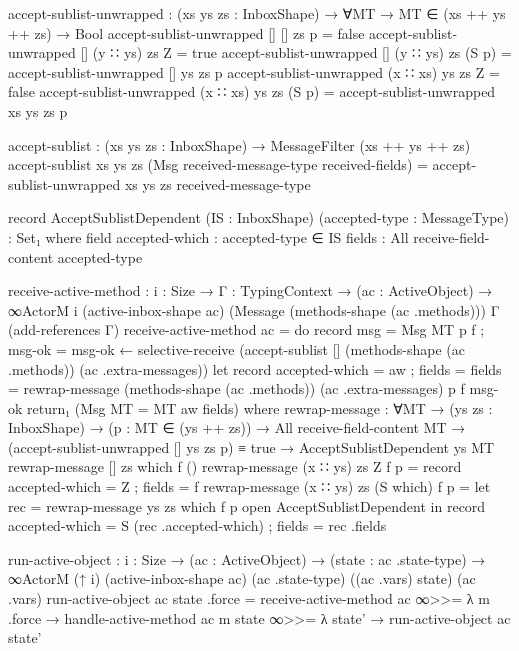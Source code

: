 \begin{code}
accept-sublist-unwrapped : (xs ys zs : InboxShape) → ∀{MT} → MT ∈ (xs ++ ys ++ zs) → Bool
accept-sublist-unwrapped [] [] zs p = false
accept-sublist-unwrapped [] (y ∷ ys) zs Z = true
accept-sublist-unwrapped [] (y ∷ ys) zs (S p) = accept-sublist-unwrapped [] ys zs p
accept-sublist-unwrapped (x ∷ xs) ys zs Z = false
accept-sublist-unwrapped (x ∷ xs) ys zs (S p) = accept-sublist-unwrapped xs ys zs p


accept-sublist : (xs ys zs : InboxShape) → MessageFilter (xs ++ ys ++ zs)
accept-sublist xs ys zs (Msg received-message-type received-fields) = accept-sublist-unwrapped xs ys zs received-message-type

record AcceptSublistDependent (IS : InboxShape) (accepted-type : MessageType) : Set₁ where
  field
    accepted-which : accepted-type ∈ IS
    fields : All receive-field-content accepted-type

receive-active-method : {i : Size} →
                        {Γ : TypingContext} →
                        (ac : ActiveObject) →
                        ∞ActorM i (active-inbox-shape ac) (Message (methods-shape (ac .methods))) Γ (add-references Γ)
receive-active-method ac = do
    record { msg = Msg {MT} p f ; msg-ok = msg-ok } ← selective-receive (accept-sublist [] (methods-shape (ac .methods)) (ac .extra-messages))
    let record {accepted-which = aw ; fields = fields } = rewrap-message (methods-shape (ac .methods)) (ac .extra-messages) p f msg-ok
    return₁ (Msg {MT = MT} aw fields)
  where
    rewrap-message : ∀{MT} → (ys zs : InboxShape) → (p : MT ∈ (ys ++ zs)) → All receive-field-content MT → (accept-sublist-unwrapped [] ys zs p) ≡ true → AcceptSublistDependent ys MT
    rewrap-message [] zs which f ()
    rewrap-message (x ∷ ys) zs Z f p = record { accepted-which = Z ; fields = f }
    rewrap-message (x ∷ ys) zs (S which) f p =
      let
        rec = rewrap-message ys zs which f p
        open AcceptSublistDependent
      in record { accepted-which = S (rec .accepted-which) ; fields = rec .fields }

run-active-object : {i : Size} →
                    (ac : ActiveObject) →
                    (state : ac .state-type) →
                    ∞ActorM (↑ i) (active-inbox-shape ac) (ac .state-type) ((ac .vars) state) (ac .vars)
run-active-object ac state .force =
  receive-active-method ac ∞>>= λ { m .force →
  handle-active-method ac m state ∞>>= λ state' →
  run-active-object ac state'
  }
\end{code}
